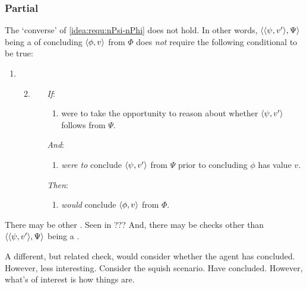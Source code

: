 \subsubsection{Partial}

\begin{note}
  The `converse' of \ref{idea:requ:nPsi-nPhi} does not hold.
  In other words, \(\langle \langle \psi, v' \rangle, \Psi \rangle\) being a \requ{} of concluding \(\langle \phi, v \rangle\) from \(\Phi\) does \emph{not} require the following conditional to be true:
  \begin{enumerate}[label=]
  \item
    \begin{enumerate}[label=]
      \setcounter{enumi}{1}
    \item
      \label{idea:requ:nPsi-nPhi:conv}
      \begin{enumerate}
      \item[\emph{If}:]
        \begin{enumerate}[label=\alph*., ref=\named{R:b.\alph*}]
        \item
          \vAgent{} were to take the opportunity to reason about whether \(\langle \psi, v' \rangle\) follows from \(\Psi\).
        \end{enumerate}
      \item[\emph{And}:]
        \begin{enumerate}[label=\alph*., ref=\named{R:b.\alph*}, resume]
        \item
          \vAgent{} \emph{were to} conclude \(\langle \psi, v' \rangle\) from \(\Psi\) prior to concluding \(\phi\) has value \(v\).
        \end{enumerate}
      \item[\emph{Then}:]
        \begin{enumerate}[label=\alph*., ref=\named{R:b.\alph*}, resume]
        \item
          \vAgent{} \emph{would} conclude \(\langle \phi, v \rangle\) from \(\Phi\).
        \end{enumerate}
      \end{enumerate}
    \end{enumerate}
  \end{enumerate}

  There may be other .
  {
    \color{red}
    Seen in ???
  }
  And, there may be checks other than \(\langle \langle \psi, v' \rangle, \Psi \rangle\) being a \requ{}.

  A different, but related check, would consider whether the agent has concluded.
  However, less interesting.
  Consider the squish scenario.
  Have concluded.
  However, what's of interest is how things are.
\end{note}

